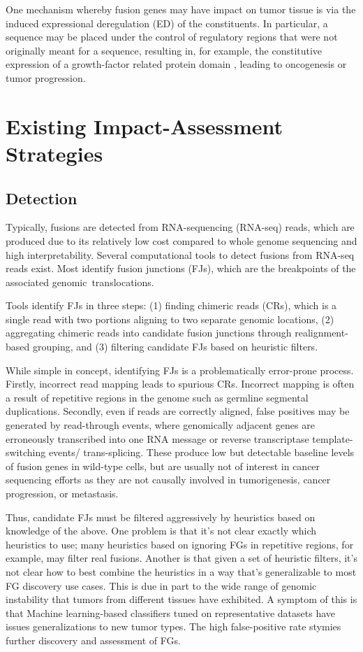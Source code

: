 One mechanism whereby fusion genes may have impact on tumor tissue is
via the induced expressional deregulation (ED) of the constituents. In particular, a sequence may be placed under the control of regulatory regions that were not originally meant for a sequence, resulting in, for example, the constitutive expression of a growth-factor related protein domain , leading to oncogenesis or tumor progression. 


\section{Existing Impact-Assessment Strategies}
\subsection{Detection}
Typically, fusions are detected from RNA-sequencing (RNA-seq) reads,
which are produced due to its relatively low cost compared to whole
genome sequencing and high interpretability. Several computational
tools to detect fusions from RNA-seq reads exist. Most identify fusion
junctions (FJs), which are the breakpoints of the associated
genomic translocations.


Tools identify FJs in three steps: (1) finding chimeric reads (CRs), which is a single read with two portions aligning to two separate genomic locations, (2) aggregating chimeric reads into candidate fusion junctions through realignment-based grouping, and (3) filtering candidate FJs based on heuristic filters. 

While simple in concept, identifying FJs is a problematically error-prone process. Firstly, incorrect read mapping leads to spurious CRs. Incorrect mapping is often a result of repetitive regions in the genome such as germline segmental duplications. Secondly, even if reads are correctly aligned, false positives may be generated by read-through events, where genomically adjacent genes are erroneously transcribed into one RNA message or reverse transcriptase template-switching events/ trans-splicing. These produce low but detectable baseline levels of fusion genes in wild-type cells, but are usually not of interest in cancer sequencing efforts as they are not causally involved in tumorigenesis, cancer progression, or metastasis\cite{gingeras_implications_2009}. 

Thus, candidate FJs must be filtered aggressively by heuristics based on knowledge of the above. One problem is that it’s not clear exactly which heuristics to use; many heuristics based on ignoring FGs in repetitive regions, for example, may filter real fusions\cite{kumar_identifying_2016}. Another is that given a set of heuristic filters, it’s not clear how to best combine the heuristics in a way that’s generalizable to most FG discovery use cases. This is due in part to the wide range of genomic instability that tumors from different tissues have exhibited. A symptom of this is that Machine learning-based classifiers tuned on representative datasets have issues generalizations to new tumor types. The high false-positive rate stymies further discovery and assessment of FGs. 

